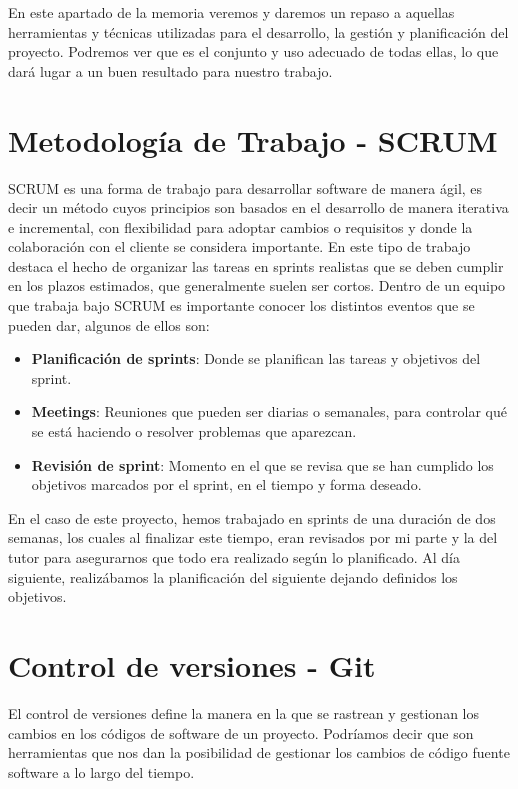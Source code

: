 En este apartado de la memoria veremos y daremos un repaso a aquellas herramientas y técnicas utilizadas para el desarrollo, la gestión y planificación del proyecto. Podremos ver que es el conjunto y uso adecuado de todas ellas, lo que dará lugar a un buen resultado para nuestro trabajo. 
\section{Metodología de Trabajo - SCRUM}
SCRUM es una forma de trabajo para desarrollar software de manera ágil\cite{AGILE}, es decir un método cuyos principios son basados en el desarrollo de manera iterativa e incremental, con flexibilidad para adoptar cambios o requisitos y donde la colaboración con el cliente se considera importante. En este tipo de trabajo destaca el hecho de organizar las tareas en sprints realistas que se deben cumplir en los plazos estimados, que generalmente suelen ser cortos.  Dentro de un equipo que trabaja bajo SCRUM\cite{SCRUM} es importante conocer los distintos eventos que se pueden dar, algunos de ellos son:
    \begin{itemize}
        \item \textbf{{Planificación de sprints}}: Donde se planifican las tareas y objetivos del sprint.
        \item \textbf{{Meetings}}: Reuniones que pueden ser diarias o semanales, para controlar qué se está haciendo o resolver problemas que aparezcan.
        \item \textbf{{Revisión de sprint}}: Momento en el que se revisa que se han cumplido los objetivos marcados por el sprint, en el tiempo y forma deseado.
    \end{itemize}
En el caso de este proyecto, hemos trabajado en sprints de una duración de dos semanas, los cuales al finalizar este tiempo, eran revisados por mi parte y la del tutor para asegurarnos que todo era realizado según lo planificado.  Al día siguiente, realizábamos la planificación del siguiente dejando definidos los objetivos.

\section{Control de versiones - Git}
El control de versiones\cite{Controldeversiones} define la manera en la que se rastrean y gestionan los cambios en los códigos de software de un proyecto. Podríamos decir que son herramientas que nos dan la posibilidad de gestionar los cambios de código fuente software a lo largo del tiempo.

